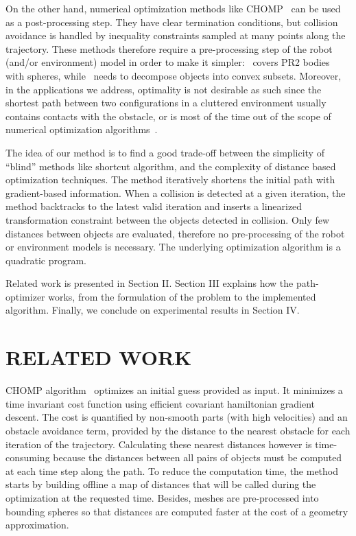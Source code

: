 \documentclass{tADR2e}
\begin{document}
On the other hand, numerical
optimization methods like CHOMP~\cite{RatliffChomp} can be used as a
post-processing step. They have clear termination conditions, but collision
avoidance is handled by inequality constraints sampled at many points along
the trajectory. These methods therefore require a pre-processing step of the
robot (and/or environment) model in order to make 
it simpler:~\cite{RatliffChomp} covers PR2 bodies with spheres, 
while~\cite{convexOptimMotplan} needs to decompose objects into convex subsets.
Moreover, in the applications we address, optimality is not desirable as
such since the shortest path between two configurations in a cluttered
environment usually contains contacts with the obstacle,
or is most of the time
out of the scope of numerical optimization algorithms~\cite{LaumondOptim}.

The idea of our method is to find a good trade-off between
the simplicity of “blind” methods like shortcut algorithm,
and the complexity of distance based optimization techniques.
The method iteratively shortens the initial path with gradient-based information.
When a collision is detected at a given iteration, the method backtracks to the
latest valid iteration and inserts a linearized transformation constraint
between the objects detected in collision. Only few distances between objects are evaluated, therefore no pre-processing of the
robot or environment models is necessary. The underlying optimization
algorithm is a quadratic program.

Related work is presented in Section II. Section III explains how the 
path-optimizer works, from the formulation of the problem to the implemented
algorithm. Finally, we conclude on experimental results in Section IV.




\section{RELATED WORK}

CHOMP algorithm~\cite{RatliffChomp} optimizes an initial guess provided as
input. It minimizes a time invariant cost function using efficient covariant
hamiltonian gradient descent. The cost is quantified by non-smooth parts (with
high velocities) and an obstacle avoidance term, provided by the distance to the 
nearest obstacle for each iteration of the trajectory. Calculating these nearest 
distances however is time-consuming because the distances between all pairs of 
objects must be computed at each time step along the path. To reduce the 
computation time, the method starts by building offline a map of distances that 
will be called during the optimization at the requested time. Besides, meshes 
are pre-processed into bounding spheres so that distances are computed faster 
at the cost of a geometry approximation.
\end{document}
